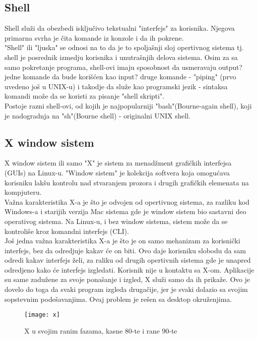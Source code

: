 \subsection{Shell}
Shell služi da obezbedi isključivo tekstualni "interfejs" za korisnika. Njegova primarna svrha je čita komande iz konzole i da ih pokrene.\\
"Shell" ili "ljuska" se odnosi na to da je to spoljašnji sloj opertivnog sistema tj. shell je posrednik izmedju korisnika i unutrašnjih delova sistema. Osim za sa samo pokretanje programa, shell-ovi imaju sposobnost da usmeravaju output? jedne komande da bude korišćen kao input? druge komande - "piping" (prvo uvedeno još u UNIX-u) i takodje da služe kao programski jezik - sintaksa komandi može da se koristi za pisanje "shell skripti".\\
Postoje razni shell-ovi, od kojih je najpopularniji "bash"(Bourne-again shell),  koji je nadogradnja na "sh"(Bourne shell) - originalni UNIX shell.
\subsection{X window sistem}
X window sistem ili samo "X" je sistem za menadžment grafičkih interfejsa (GUIs) na Linux-u. "Window sistem" je kolekcija softvera koja omogućava korisniku lakšu kontrolu nad stvaranjem prozora i drugih grafičkih elemenata na kompjuteru.\\
Važna karakteristika X-a je što je odvojen od opertivnog sistema, za razliku kod Windows-a i starijih verzija Mac sistema gde je window sistem bio sastavni deo operativog sistema. Na Linux-u, i bez window sistema, sistem može da se kontroliše kroz komandni interfejs (CLI).\\
Još jedna važna karakteristika X-a je što je on samo mehanizam za korisnički interfejs, bez da odredjuje kakav će on biti. Ovo daje korisniku slobodu da sam odredi kakav interfejs želi, za raliku od drugih opertivnih sistema gde je unapred odredjeno kako će interfejs izgledati. Korisnik nije u kontaktu sa X-om. Aplikacije su same zadužene za svoje ponašanje i izgled, X služi samo da ih prikaže. Ovo je dovelo do toga da svaki program izgleda drugačije, jer je svaki dolazio sa svojim sopstevnim podešavanjima. Ovaj problem je rešen sa desktop okruženjima.\\
\begin{figure}[H]
	\centering
	\texttt{[image: x]}
	\caption{X u svojim ranim fazama, kasne 80-te i rane 90-te}
\end{figure}
